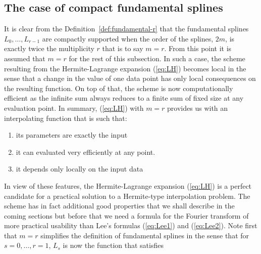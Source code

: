 \subsection{The case of compact fundamental splines}

It is clear from the Definition~\ref{def:fundamental-r} that the fundamental splines $L_0, \ldots, L_{r-1}$ are 
compactly supported when the order of the splines, $2m$, is exactly twice the multiplicity $r$ that is to say $m=r$.  
From this point it is assumed that $m=r$ for the rest of this subsection.  In such a case, the scheme resulting from the 
Hermite-Lagrange expansion (\ref{eq:LH}) becomes local in the sense that a change in the value of one data point has 
only local consequences on the resulting function. On top of that, the scheme is now computationally efficient as the 
infinite sum always reduces to a finite sum of fixed size at any evaluation point. In summary, (\ref{eq:LH}) with $m=r$ 
provides us with an interpolating function that is such that: 

\begin{enumerate}
  \item its parameters are exactly the input
  \item it can evaluated very efficiently at any point.  
  \item it depends only locally on the input data
\end{enumerate}

In view of these features, the Hermite-Lagrange expansion (\ref{eq:LH}) is a perfect candidate for a practical solution 
to a Hermite-type interpolation problem. The scheme has in fact additional good properties that we shall describe in the 
coming sections but before that we need a formula for the Fourier transform of more practical usability than Lee's 
formulas (\ref{eq:Lee1}) and (\ref{eq:Lee2}). Note first that $m=r$ simplifies the definition of fundamental splines in 
the sense that for ${s=0, \ldots, r=1}$, $L_s$ is now the function that satisfies

